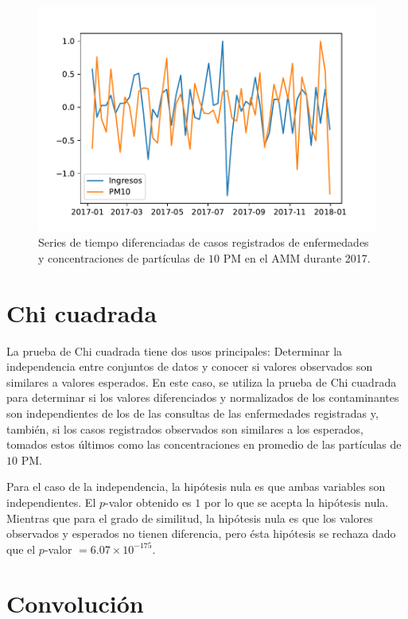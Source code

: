 \documentclass[paper=leter, fontsize=11pt]{scrartcl}
\begin{document}
\begin{figure}
    \centering
    \includegraphics{2017_ingresos_PM10_diff_semana.pdf}
  \caption{Series de tiempo diferenciadas de casos registrados de enfermedades y concentraciones de partículas de $10$ PM en el AMM durante 2017.}
  \label{diff}
\end{figure}

\section{Chi cuadrada}

La prueba de Chi cuadrada tiene dos usos principales: Determinar la independencia entre conjuntos de datos y conocer si valores observados son similares a valores esperados. En este caso, se utiliza la prueba de Chi cuadrada para determinar si los valores diferenciados y normalizados de los contaminantes son independientes de los de las consultas de las enfermedades registradas y, también, si los casos registrados observados son similares a los esperados, tomados estos últimos como las concentraciones en promedio de las partículas de $10$ PM. 

Para el caso de la independencia, la hipótesis nula es que ambas variables son independientes. El $p$-valor obtenido es $1$ por lo que se acepta la hipótesis nula. Mientras que para el grado de similitud, la hipótesis nula es que los valores observados y esperados no tienen diferencia, pero ésta hipótesis se rechaza dado que el $p$-valor $= 6.07 \times 10 ^{-175}$.

\section{Convolución}
\end{document}
